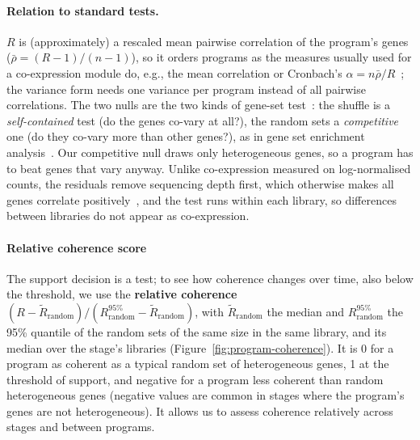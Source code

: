 \documentclass[11pt,a4paper]{article}
\begin{document}
\paragraph{Relation to standard tests.} $R$ is (approximately) a rescaled mean pairwise correlation of the program's genes ($\bar\rho = (R-1)/(n-1)$), so it orders programs as the measures usually used for a co-expression module do, e.g., the mean correlation or Cronbach's $\alpha = n\bar\rho/R$~\cite{cronbach1951alpha}; the variance form needs one variance per program instead of all pairwise correlations. The two nulls are the two kinds of gene-set test~\cite{goeman2007genesets}: the shuffle is a \emph{self-contained} test (do the genes co-vary at all?), the random sets a \emph{competitive} one (do they co-vary more than other genes?), as in gene set enrichment analysis~\cite{subramanian2005gsea}. Our competitive null draws only heterogeneous genes, so a program has to beat genes that vary anyway. Unlike co-expression measured on log-normalised counts, the residuals remove sequencing depth first, which otherwise makes all genes correlate positively~\cite{hafemeister2019sctransform}, and the test runs within each library, so differences between libraries do not appear as co-expression.

\paragraph{Relative coherence score}

The support decision is a test; to see how coherence changes over time, also below the threshold, we use the \textbf{relative coherence} $(R - \tilde R_\text{random}) / (R_\text{random}^{95\%} - \tilde R_\text{random})$, with $\tilde R_\text{random}$ the median and $R_\text{random}^{95\%}$ the 95\% quantile of the random sets of the same size in the same library, and its median over the stage's libraries (Figure~\ref{fig:program-coherence}). It is 0 for a program as coherent as a typical random set of heterogeneous genes, 1 at the threshold of support, and negative for a program less coherent than random heterogeneous genes (negative values are common in stages where the program's genes are not heterogeneous). It allows us to assess coherence relatively across stages and between programs.
\end{document}
